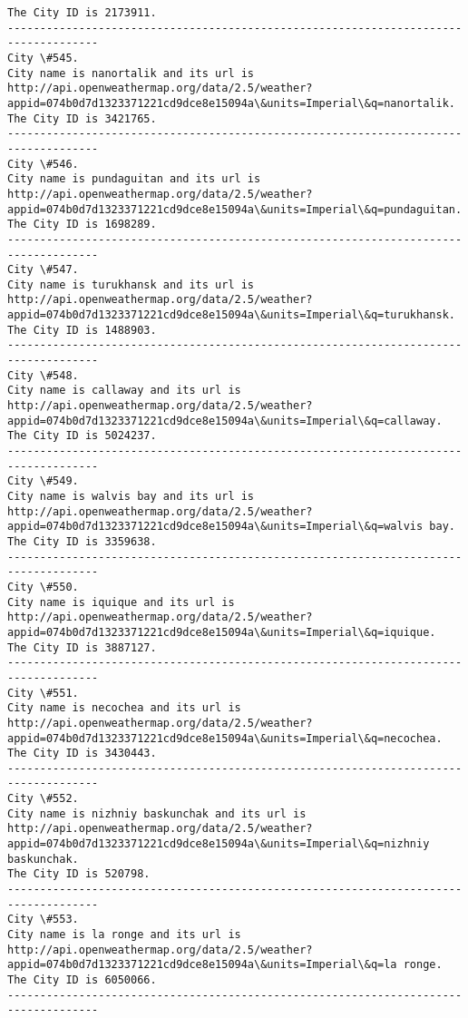 \documentclass[11pt]{article}
\begin{document}
\begin{Verbatim}[commandchars=\\\{\}]
The City ID is 2173911.
------------------------------------------------------------------------------------
City \#545.
City name is nanortalik and its url is http://api.openweathermap.org/data/2.5/weather?appid=074b0d7d1323371221cd9dce8e15094a\&units=Imperial\&q=nanortalik.
The City ID is 3421765.
------------------------------------------------------------------------------------
City \#546.
City name is pundaguitan and its url is http://api.openweathermap.org/data/2.5/weather?appid=074b0d7d1323371221cd9dce8e15094a\&units=Imperial\&q=pundaguitan.
The City ID is 1698289.
------------------------------------------------------------------------------------
City \#547.
City name is turukhansk and its url is http://api.openweathermap.org/data/2.5/weather?appid=074b0d7d1323371221cd9dce8e15094a\&units=Imperial\&q=turukhansk.
The City ID is 1488903.
------------------------------------------------------------------------------------
City \#548.
City name is callaway and its url is http://api.openweathermap.org/data/2.5/weather?appid=074b0d7d1323371221cd9dce8e15094a\&units=Imperial\&q=callaway.
The City ID is 5024237.
------------------------------------------------------------------------------------
City \#549.
City name is walvis bay and its url is http://api.openweathermap.org/data/2.5/weather?appid=074b0d7d1323371221cd9dce8e15094a\&units=Imperial\&q=walvis bay.
The City ID is 3359638.
------------------------------------------------------------------------------------
City \#550.
City name is iquique and its url is http://api.openweathermap.org/data/2.5/weather?appid=074b0d7d1323371221cd9dce8e15094a\&units=Imperial\&q=iquique.
The City ID is 3887127.
------------------------------------------------------------------------------------
City \#551.
City name is necochea and its url is http://api.openweathermap.org/data/2.5/weather?appid=074b0d7d1323371221cd9dce8e15094a\&units=Imperial\&q=necochea.
The City ID is 3430443.
------------------------------------------------------------------------------------
City \#552.
City name is nizhniy baskunchak and its url is http://api.openweathermap.org/data/2.5/weather?appid=074b0d7d1323371221cd9dce8e15094a\&units=Imperial\&q=nizhniy baskunchak.
The City ID is 520798.
------------------------------------------------------------------------------------
City \#553.
City name is la ronge and its url is http://api.openweathermap.org/data/2.5/weather?appid=074b0d7d1323371221cd9dce8e15094a\&units=Imperial\&q=la ronge.
The City ID is 6050066.
------------------------------------------------------------------------------------

\end{Verbatim}
\end{document}
